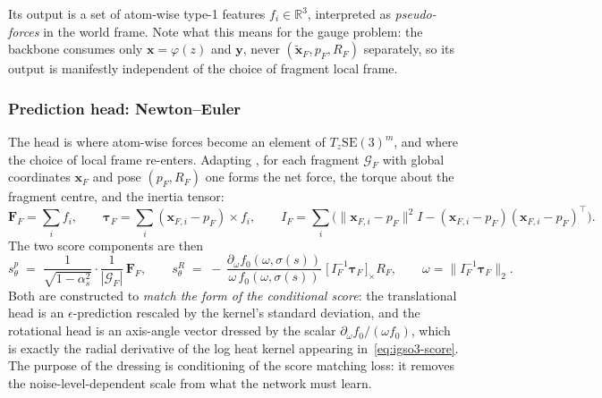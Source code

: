 \documentclass[a4paper,12pt]{article}
\theoremstyle{remark}
\begin{document}
Its output is a set of atom-wise type-1 features $f_i \in \mathbb{R}^3$, interpreted as
\emph{pseudo-forces} in the world frame. Note what this means for the gauge problem: the backbone
consumes only $\mathbf{x} = \varphi(z)$ and $\mathbf{y}$, never $(\tilde{\mathbf{x}}_F, p_F, R_F)$
separately, so its output is manifestly independent of the choice of fragment local frame.

\subsubsection{Prediction head: Newton--Euler}
\label{sec:newton-euler}

The head is where atom-wise forces become an element of $T_z \mathrm{SE}(3)^m$, and where the choice
of local frame re-enters. Adapting \cite{bortoliRiemannianScoreBasedGenerative2022}, for each fragment $\mathcal{G}_F$ with
global coordinates $\mathbf{x}_F$ and pose $(p_F, R_F)$ one forms the net force, the torque about
the fragment centre, and the inertia tensor:
\begin{equation}
\label{eq:newton-euler}
  \mathbf{F}_F = \sum_{i} f_i,
  \qquad
  \bm{\tau}_F = \sum_{i} (\mathbf{x}_{F,i} - p_F) \times f_i,
  \qquad
  I_F = \sum_{i} \Big( \|\mathbf{x}_{F,i} - p_F\|^2 I - (\mathbf{x}_{F,i} - p_F)(\mathbf{x}_{F,i} - p_F)^{\top} \Big).
\end{equation}
The two score components are then
\begin{equation}
\label{eq:sd-head}
  s^{p}_{\theta} \;=\; \frac{1}{\sqrt{1-\alpha_s^2}} \cdot \frac{1}{|\mathcal{G}_F|}\, \mathbf{F}_F,
  \qquad
  s^{R}_{\theta} \;=\; -\,\frac{\partial_\omega f_0(\omega, \sigma(s))}{\omega\, f_0(\omega, \sigma(s))}\;
  \big[\, I_F^{-1} \bm{\tau}_F \,\big]_{\times} R_F,
  \qquad \omega = \big\| I_F^{-1} \bm{\tau}_F \big\|_2 .
\end{equation}
Both are constructed to \emph{match the form of the conditional score}: the translational head is an
$\epsilon$-prediction rescaled by the kernel's standard deviation, and the rotational head is an
axis-angle vector dressed by the scalar $\partial_\omega f_0 / (\omega f_0)$, which is exactly the
radial derivative of the log heat kernel appearing in~\eqref{eq:igso3-score}. The purpose of the
dressing is conditioning of the score matching loss: it removes the noise-level-dependent scale from
what the network must learn.
\end{document}
